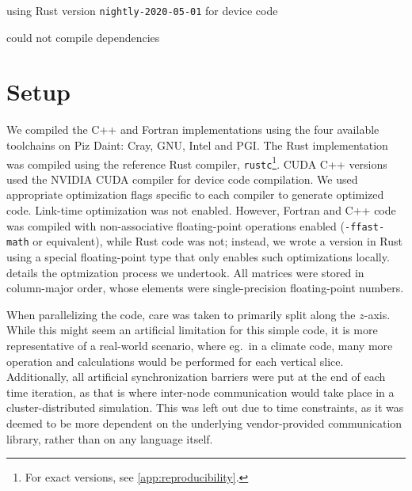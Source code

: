 \documentclass[british]{scrreprt}
\begin{document}
\begin{table}
	\centering
	\def\TPTminimum{\textwidth}
	\begin{threeparttable}
		\begin{tablenotes}
			\makeatletter
			\footnotesize
			\item[\@fnsymbol{8}]{using Rust version \texttt{nightly-2020-05-01} for device code}
			\item[\@fnsymbol{9}]{could not compile dependencies}
			\makeatother
		\end{tablenotes}
	\end{threeparttable}
	\caption{Rust compiler support for different technologies.}
	\label{tab:rust-support}
\end{table}

\section{Setup}
\label{sec:setup}
We compiled the C++ and Fortran implementations using the four available toolchains on Piz Daint: Cray, GNU, Intel and PGI. The Rust implementation was compiled using the reference Rust compiler, \texttt{rustc}\footnote{For exact versions, see \cref{app:reproducibility}.}. CUDA C++ versions used the NVIDIA CUDA compiler for device code compilation. We used appropriate optimization flags specific to each compiler to generate optimized code. Link-time optimization was not enabled. However, Fortran and C++ code was compiled with non-associative floating-point operations enabled (\texttt{-ffast-math} or equivalent), while Rust code was not; instead, we wrote a version in Rust using a special floating-point type that only enables such optimizations locally.  details the optmization process we undertook. All matrices were stored in column-major order, whose elements were single-precision floating-point numbers.

When parallelizing the code, care was taken to primarily split along the \( z \)-axis. While this might seem an artificial limitation for this simple code, it is more representative of a real-world scenario, where eg.\ in a climate code, many more operation and calculations would be performed for each vertical slice. Additionally, all artificial synchronization barriers were put at the end of each time iteration, as that is where inter-node communication would take place in a cluster-distributed simulation. This was left out due to time constraints, as it was deemed to be more dependent on the underlying vendor-provided communication library, rather than on any language itself.
\end{document}
